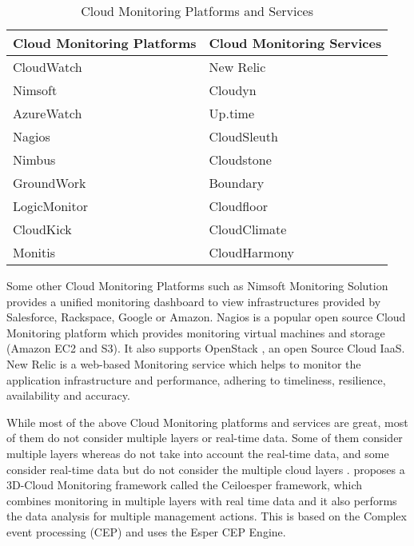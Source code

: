 \documentclass[article,type=msc,colorback,12pt,accentcolor=tud7b]{tudthesis}
\begin{document}
\begin{table}[h!]
  \centering
  \caption{Cloud Monitoring Platforms and Services \cite{aceto2013cloud} }
  \label{tab:Table1}
  \begin{tabular}{l|l}
  \hline
  \textbf{Cloud Monitoring Platforms}  & \textbf{Cloud Monitoring Services} \\
    \hline
    CloudWatch \cite{cloudwatchdev} \cite{cloudwatch} & New Relic \cite{newrelic} \\    
    Nimsoft \cite{nimsoft} & Cloudyn \cite{cloudyn} \\        
    AzureWatch \cite{azurewatch} & Up.time \cite{uptime} \\        
    Nagios \cite{nagios} & CloudSleuth \cite{cloudsleuth} \\
    Nimbus \cite{nimbus} & Cloudstone \cite{cloudstone} \\ 
    GroundWork \cite{groundwork} & Boundary \cite{boundary} \\
    LogicMonitor \cite{logicmonitor} & Cloudfloor \cite{cloudfloor} \\ 
    CloudKick \cite{cloudkick} & CloudClimate \cite{cloudclimate} \\    
    Monitis \cite{monitis} & CloudHarmony \cite{cloudharmony} \\
    \hline
    
  \end{tabular}
\end{table}
	
	Some other Cloud Monitoring Platforms such as Nimsoft Monitoring Solution \cite{nimsoft} provides a unified monitoring dashboard to view infrastructures provided by Salesforce, Rackspace, Google or Amazon. Nagios \cite{nagios} is a popular open source Cloud Monitoring platform which provides monitoring virtual machines and storage (Amazon EC2 and S3). It also supports OpenStack \cite{openstack}, an open Source Cloud IaaS. New Relic \cite{newrelic} is a web-based Monitoring service which helps to monitor the application infrastructure and performance, adhering to timeliness, resilience, availability and accuracy.
	
	While most of the above Cloud Monitoring platforms and services are great, most of them do not consider multiple layers or real-time data. Some of them consider multiple layers whereas do not take into account the real-time data, and some consider real-time data but do not consider the multiple cloud layers \cite{marquezan20143}. \cite{bruneo2015framework} proposes a 3D-Cloud Monitoring framework called the Ceiloesper framework, which combines monitoring in multiple layers with real time data and it also performs the data analysis for multiple management actions. This is based on the Complex event processing (CEP) and uses the Esper CEP Engine.
 		
\end{document}
